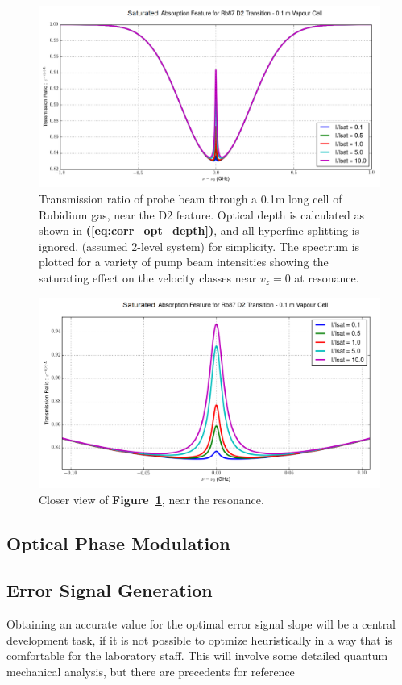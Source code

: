 \begin{figure}[!hrt]
  \centering
  \includegraphics[scale=0.5]{rb_D2_single_absorption.png}
  \caption{Transmission ratio of probe beam through a 0.1m long cell of Rubidium
  gas, near the D2 feature. Optical depth is calculated as shown in
  \textbf{(\ref{eq:corr_opt_depth})},
  and all hyperfine splitting is ignored, (assumed 2-level system) for
  simplicity. The spectrum is plotted for a variety of pump beam intensities
  showing the saturating effect on the velocity classes near $v_z = 0$ at
  resonance.}
  \label{fig:rb87d2abs}
\end{figure}

\begin{figure}[!hrt]
  \centering
  \includegraphics[scale=0.5]{rb_D2_single_absorption_resonance.png}
  \caption{Closer view of \textbf{Figure~\ref{fig:rb87d2abs}}, near the
  resonance.}
  \label{fig:rb87d2abs_closer}
\end{figure}

\subsection{Optical Phase Modulation}

\subsection{Error Signal Generation}

Obtaining an accurate value for the optimal error signal slope will be a central
development task, if it is not possible to optmize heuristically in a way that
is comfortable for the laboratory staff. This will involve some detailed
quantum mechanical analysis, but there are precedents for reference
\cite{maguire2006}

